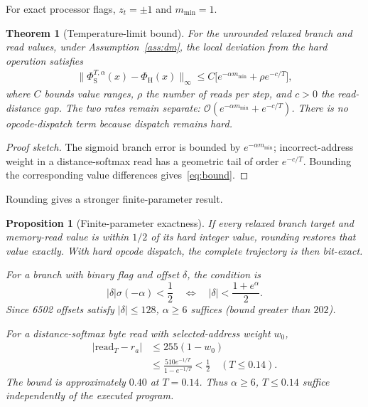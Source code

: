 \documentclass[letterpaper]{article} %
\newtheorem{theorem}{Theorem}
\newtheorem{proposition}{Proposition}
\begin{document}
For exact processor flags, $z_t=\pm1$ and
$m_{\min}=1$.

\begin{theorem}[Temperature-limit bound]
\label{thm:limit}
For the unrounded relaxed branch and read values,
under Assumption~\ref{ass:dm}, the local deviation
from the hard operation satisfies
\begin{equation}
\begin{aligned}
\big\|\Phi_{\mathrm{S}}^{T,\alpha}(x)
-\Phi_{\mathrm{H}}(x)\big\|_\infty
\le C\big[
e^{-\alpha m_{\min}}
+\rho e^{-c/T}\big],
\end{aligned}
\label{eq:bound}
\end{equation}
where $C$ bounds value ranges, $\rho$ the number of
reads per step, and $c>0$ the read-distance gap.
The two rates remain separate:
$\mathcal{O}(e^{-\alpha m_{\min}}+e^{-c/T})$.
There is no opcode-dispatch term because dispatch
remains hard.
\end{theorem}

\begin{proof}[Proof sketch]
The sigmoid branch error is bounded by
$e^{-\alpha m_{\min}}$; incorrect-address weight
in a distance-softmax read has a geometric tail
of order $e^{-c/T}$. Bounding the corresponding
value differences gives~\eqref{eq:bound}.
\end{proof}

Rounding gives a stronger finite-parameter result.

\begin{proposition}[Finite-parameter exactness]
\label{prop:finite}
If every relaxed branch target and memory-read value
is within $1/2$ of its hard integer value, rounding
restores that value exactly. With hard opcode dispatch,
the complete trajectory is then bit-exact.

For a branch with binary flag and offset $\delta$,
the condition is
\begin{equation}
|\delta|\sigma(-\alpha)<\frac12
\quad\Longleftrightarrow\quad
|\delta|<\frac{1+e^\alpha}{2}.
\label{eq:branchcorner}
\end{equation}
Since 6502 offsets satisfy $|\delta|\le128$,
$\alpha\ge6$ suffices (bound greater than $202$).

For a distance-softmax byte read with selected-address
weight $w_0$,
\begin{equation}
\begin{aligned}
|\mathrm{read}_{T}-r_a|
&\le255(1-w_0)\\
&\le\frac{510e^{-1/T}}{1-e^{-1/T}}
<\frac12 \quad (T\le0.14).
\end{aligned}
\label{eq:readcorner}
\end{equation}
The bound is approximately $0.40$ at $T=0.14$.
Thus $\alpha\ge6$, $T\le0.14$ suffice independently
of the executed program.
\end{proposition}
\end{document}
